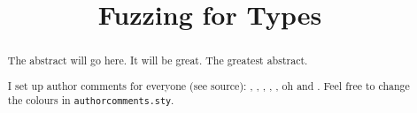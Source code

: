 \documentclass[sigconf,review,anonymous]{acmart}
\begin{document}
\title{Fuzzing for Types}

\begin{abstract}
The abstract will go here.
It will be great.
The greatest abstract.

I set up author comments for everyone (see source): , , , , , oh and .
Feel free to change the colours in {\tt authorcomments.sty}.
\end{abstract}

\maketitle














\end{document}
